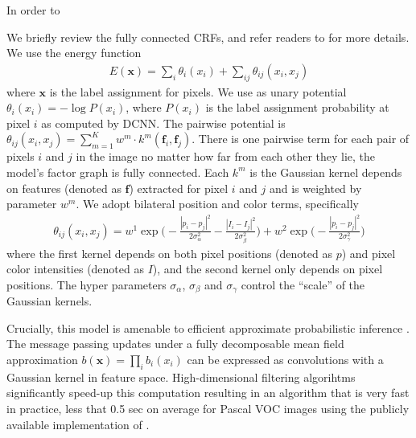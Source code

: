 In order to 

We briefly review the fully connected CRFs, and refer readers to
\citep{krahenbuhl2011efficient} for more details. We use the energy function
\begin{align}
  E(\boldsymbol{x}) = \sum_i \theta_i(x_i) + \sum_{ij} \theta_{ij}(x_i, x_j)
\end{align}
where $\boldsymbol{x}$ is the label assignment for pixels. We use as unary
potential $\theta_i(x_i) = - \log P(x_i)$, where $P(x_i)$ is the label
assignment probability at pixel $i$ as computed by DCNN. The pairwise
potential is $\theta_{ij}(x_i, x_j) = \sum_{m=1}^{K} w^m \cdot
k^m(\boldsymbol{f}_i, \boldsymbol{f}_j)$. There is one pairwise term for each
pair of pixels $i$ and $j$ in the image no matter how far from each other they
lie, \ie the model's factor graph is fully connected. Each $k^m$ is the
Gaussian kernel depends on features (denoted as $\boldsymbol{f}$) extracted for pixel $i$ and $j$ and is
weighted by parameter $w^m$. We adopt bilateral position and color terms,
specifically
\begin{align}
  \label{eq:fully_crf}
  \theta_{ij}(x_i, x_j) = w^1 \exp \Big(-\frac{|p_i-p_j|^2}{2\sigma_\alpha^2} -\frac{|I_i-I_j|^2}{2\sigma_\beta^2} \Big) + w^2 \exp \Big(-\frac{|p_i-p_j|^2}{2\sigma_\gamma^2}\Big)
\end{align}
where the first kernel depends on both pixel positions (denoted as $p$) and
pixel color intensities (denoted as $I$), and the second kernel only depends
on pixel positions. The hyper parameters $\sigma_\alpha$, $\sigma_\beta$ and
$\sigma_\gamma$ control the ``scale'' of the Gaussian kernels.

Crucially, this model is amenable to efficient approximate probabilistic
inference \citep{krahenbuhl2011efficient}. The message passing updates under a
fully decomposable mean field approximation $b(\boldsymbol{x}) = \prod_i
b_i(x_i)$ can be expressed as convolutions with a Gaussian kernel in feature
space. High-dimensional filtering algorihtms \citep{adams2010fast}
significantly speed-up this computation resulting in an algorithm that is very
fast in practice, less that 0.5 sec on average for Pascal VOC images using the
publicly available implementation of \citep{krahenbuhl2011efficient}.

